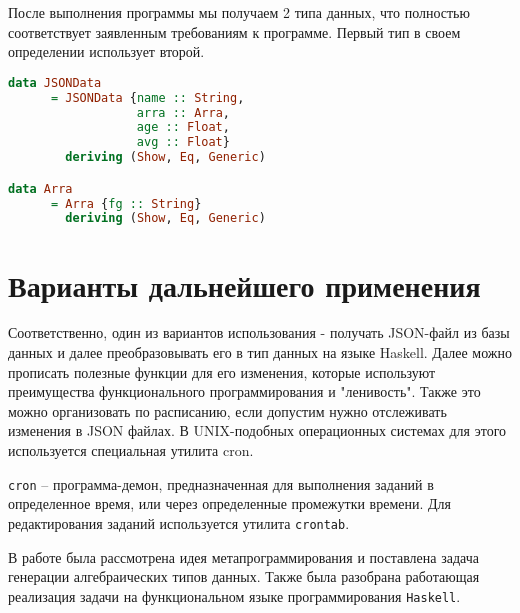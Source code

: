После выполнения программы мы получаем 2 типа данных, что полностью соответствует заявленным требованиям к программе. Первый тип в своем определении использует второй. 

\begin{lstlisting}[language=Haskell]
data JSONData
      = JSONData {name :: String,
                  arra :: Arra,
                  age :: Float,
                  avg :: Float}
        deriving (Show, Eq, Generic)

data Arra
      = Arra {fg :: String}
        deriving (Show, Eq, Generic)            
\end{lstlisting}

\chapter{Варианты дальнейшего применения}

Соответственно, один из вариантов использования - получать JSON-файл из базы данных и далее преобразовывать его в тип данных на языке Haskell. Далее можно прописать полезные функции для его изменения, которые используют преимущества функционального программирования и "ленивость". Также это можно организовать по расписанию, если допустим нужно отслеживать изменения в JSON файлах. В UNIX-подобных операционных системах для этого используется специальная утилита cron.

\lstinline{cron} – программа-демон, предназначенная для выполнения заданий в определенное время, или через определенные промежутки времени. Для редактирования заданий используется утилита \lstinline{crontab}.

\Conc

В работе была рассмотрена идея метапрограммирования и поставлена задача генерации алгебраических типов данных. Также была разобрана работающая реализация задачи на функциональном языке программирования \lstinline{Haskell}. 

\printbibliography[%
    heading=bibintoc%
]


